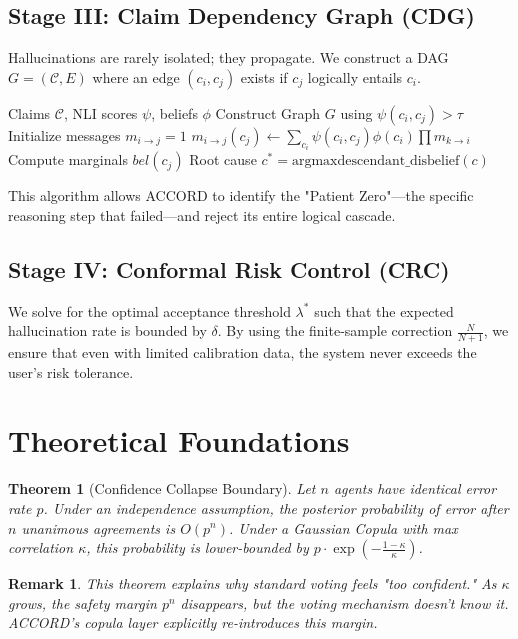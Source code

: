 \documentclass[conference]{IEEEtran}
\newtheorem{theorem}{Theorem}
\newtheorem{remark}{Remark}
\begin{document}
\subsection{Stage III: Claim Dependency Graph (CDG)}
Hallucinations are rarely isolated; they propagate. We construct a DAG $G=(\mathcal{C}, E)$ where an edge $(c_i, c_j)$ exists if $c_j$ logically entails $c_i$. 
\begin{algorithm}
\caption{Patient Zero Attribution}
\label{alg:patientzero}
\begin{algorithmic}[1]
\REQUIRE Claims $\mathcal{C}$, NLI scores $\psi$, beliefs $\phi$
\STATE Construct Graph $G$ using $\psi(c_i, c_j) > \tau$
\STATE Initialize messages $m_{i \to j} = 1$
    \STATE $m_{i \to j}(c_j) \leftarrow \sum_{c_i} \psi(c_i, c_j)\phi(c_i) \prod m_{k \to i}$
\ENDFOR
\STATE Compute marginals $bel(c_j)$
\RETURN Root cause $c^* = \text{argmax} \text{descendant\_disbelief}(c)$
\end{algorithmic}
\end{algorithm}
This algorithm allows ACCORD to identify the "Patient Zero"—the specific reasoning step that failed—and reject its entire logical cascade.

\subsection{Stage IV: Conformal Risk Control (CRC)}
We solve for the optimal acceptance threshold $\lambda^*$ such that the expected hallucination rate is bounded by $\delta$. By using the finite-sample correction $\frac{N}{N+1}$, we ensure that even with limited calibration data, the system never exceeds the user's risk tolerance.

\section{Theoretical Foundations}

\begin{theorem}[Confidence Collapse Boundary]
Let $n$ agents have identical error rate $p$. Under an independence assumption, the posterior probability of error after $n$ unanimous agreements is $O(p^n)$. Under a Gaussian Copula with max correlation $\kappa$, this probability is lower-bounded by $p \cdot \exp(-\frac{1-\kappa}{\kappa})$.
\end{theorem}
\begin{remark}
This theorem explains why standard voting feels "too confident." As $\kappa$ grows, the safety margin $p^n$ disappears, but the voting mechanism doesn't know it. ACCORD's copula layer explicitly re-introduces this margin.
\end{remark}
\end{document}
